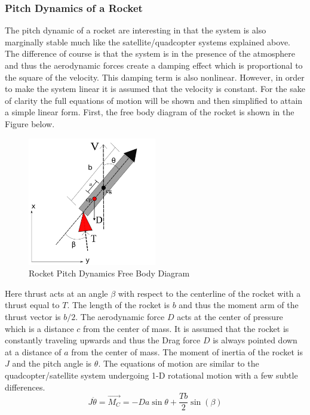 \subsubsection{Pitch Dynamics of a Rocket}

The pitch dynamic of a rocket are interesting in that the system is also marginally stable much like the satellite/quadcopter systems explained above. The difference of course is that the system is in the presence of the atmosphere and thus the aerodynamic forces create a damping effect which is proportional to the square of the velocity. This damping term is also nonlinear. However, in order to make the system linear it is assumed that the velocity is constant. For the sake of clarity the full equations of motion will be shown and then simplified to attain a simple linear form. First, the free body diagram of the rocket is shown in the Figure below.
\begin{figure}[H]
    \centering
    \includegraphics[width=0.5\textwidth]{Figures/Rocket.png}
    \caption{Rocket Pitch Dynamics Free Body Diagram}
\end{figure}
Here thrust acts at an angle $\beta$ with respect to the centerline of the rocket with a thrust equal to $T$. The length of the rocket is $b$ and thus the moment arm of the thrust vector is $b/2$. The aerodynamic force $D$ acts at the center of pressure which is a distance $c$ from the center of mass. It is assumed that the rocket is constantly traveling upwards and thus the Drag force $D$ is always pointed down at a distance of $a$ from the center of mass. The moment of inertia of the rocket is $J$ and the pitch angle is $\theta$. The equations of motion are similar to the quadcopter/satellite system undergoing 1-D rotational motion with a few subtle differences. 
\begin{equation}
    J\ddot{\theta} = \vec{M_C} = -D a \sin{\theta} + \frac{Tb}{2} \sin(\beta)
\end{equation}

